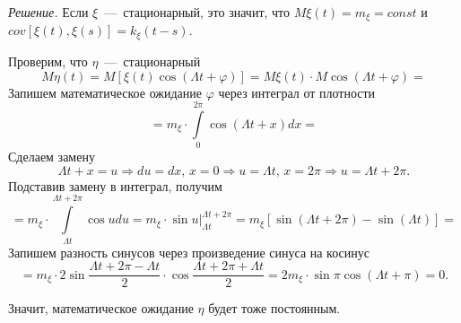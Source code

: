 \textit{Решение.}
Если $ \xi $~---~стационарный, это значит,
что $M \xi \left( t \right) = m_{ \xi } = const$ и
$cov \left[ \xi \left( t \right), \xi \left( s \right) \right] =
  k_{ \xi } \left( t - s \right) $.

Проверим, что $ \eta $~---~стационарный
\begin{equation*}
  M \eta \left( t \right) =
  M \left[ \xi \left( t \right) \cos \left( \Lambda t + \varphi \right) \right] =
  M \xi \left( t \right) \cdot M \cos \left( \Lambda t + \varphi \right) =
\end{equation*}
Запишем математическое ожидание $ \varphi $ через интеграл от плотности
\begin{equation*}
  = m_{ \xi } \cdot \int \limits_0^{2 \pi } \cos \left( \Lambda t + x \right) dx =
\end{equation*}
Сделаем замену
\begin{equation*}
  \Lambda t + x = u \Rightarrow du = dx, \,
  x = 0 \Rightarrow u = \Lambda t, \,
  x = 2 \pi \Rightarrow u = \Lambda t + 2 \pi.
\end{equation*}
Подставив замену в интеграл, получим
\begin{equation*}
  = m_{ \xi } \cdot \int \limits_{ \Lambda t}^{ \Lambda t + 2 \pi } \cos u du =
  m_{ \xi } \cdot \left. \sin u \right|_{ \Lambda t}^{ \Lambda t + 2 \pi } =
  m_{ \xi } \left[ \sin \left( \Lambda t + 2 \pi \right) - \sin \left( \Lambda t \right) \right] =
\end{equation*}
Запишем разность синусов через произведение синуса на косинус
\begin{equation*}
  = m_{ \xi } \cdot 2 \sin \frac{ \Lambda t + 2 \pi - \Lambda t}{2} \cdot
  \cos \frac{ \Lambda t + 2 \pi + \Lambda t}{2} =
  2m_{ \xi } \cdot \sin \pi \cos \left( \Lambda t + \pi \right) =
  0.
\end{equation*}

Значит, математическое ожидание $ \eta $ будет тоже постоянным.

